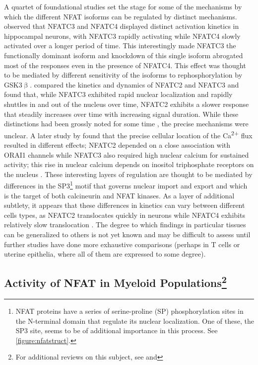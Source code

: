 A quartet of foundational studies set the stage for some of the mechanisms by which the different NFAT isoforms can be regulated by distinct mechanisms. \citet{Ulrich2012} observed that NFATC3 and NFATC4 displayed distinct activation kinetics in hippocampal neurons, with NFATC3 rapidly activating while NFATC4 slowly activated over a longer period of time. This interestingly made NFATC3 the functionally dominant isoform and knockdown of this single isoform abrogated most of the responses even in the presence of NFATC4. This effect was thought to be mediated by different sensitivity of the isoforms to rephosphorylation by GSK3$\upbeta$. \citet{Yissachar2013} compared the kinetics and dynamics of NFATC2 and NFATC3 and found that, while NFATC3 exhibited rapid nuclear localization and rapidly shuttles in and out of the nucleus over time, NFATC2 exhibits a slower response that steadily increases over time with increasing signal duration. While these distinctions had been grossly noted for some time \citep{Chow1997, Rinne2009}, the precise mechanisms were unclear. A later study by \citet{Kar2015} found that the precise cellular location of the Ca\textsuperscript{2+} flux resulted in different effects; NFATC2 depended on a close association with ORAI1 channels while NFATC3 also required high nuclear calcium for sustained activity; this rise in nuclear calcium depends on inositol triphosphate receptors on the nucleus \citep{Kar2016}. These interesting layers of regulation are thought to be mediated by differences in the SP3\footnote{NFAT proteins have a series of serine-proline (SP) phosphorylation sites in the N-terminal domain that regulate its nuclear localization. One of these, the SP3 site, seems to be of additional importance in this process. See \autoref{figure:nfatstruct}.} motif that governs nuclear import and export and which is the target of both calcineurin and NFAT kinases. As a layer of additional subtlety, it appears that these differences in kinetics can vary between different cells types, as NFATC2 translocates quickly in neurons while NFATC4 exhibits relatively slow translocation \citep{Vihma2016}. The degree to which findings in particular tissues can be generalized to others is not yet known and may be difficult to assess until further studies have done more exhaustive comparisons (perhaps in T cells or uterine epithelia, where all of them are expressed to some degree). 

\subsection[Activity of NFAT in Myeloid Populations]{Activity of NFAT in Myeloid Populations\footnote{For additional reviews on this subject, see  and }}\label{myeloidnfat}

